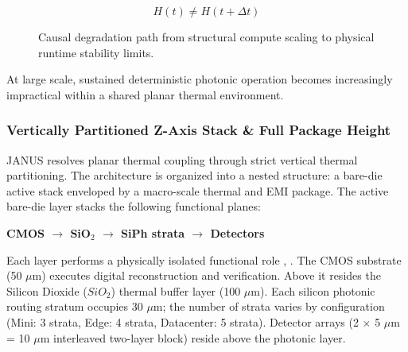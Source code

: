 \documentclass[journal]{IEEEtran}
\begin{document}
\begin{equation}
H(t) \neq  H(t + \Delta t)
\end{equation}

\begin{figure}[htbp]
\centering
{}
\caption{Causal degradation path from structural compute scaling to physical runtime stability limits.}
\label{fig:causal_degradation}
\end{figure}

At large scale, sustained deterministic photonic operation becomes increasingly impractical within a shared planar thermal environment.

\subsubsection{\textbf{Vertically Partitioned Z-Axis Stack \& Full Package Height}}

JANUS resolves planar thermal coupling through strict vertical thermal partitioning. The architecture is organized into a nested structure: a bare-die active stack enveloped by a macro-scale thermal and EMI package. The active bare-die layer stacks the following functional
planes:

\begin{center}
\textbf{CMOS $\rightarrow$ SiO$_2$ $\rightarrow$ SiPh strata $\rightarrow$ Detectors}
\end{center}

Each layer performs a physically isolated functional role \cite{Atabaki2018}, \cite{Fenouillet2009}. The CMOS substrate (50 $\mu$m) executes digital reconstruction and verification. Above it resides the Silicon Dioxide ($SiO_2$) thermal buffer layer (100 $\mu$m). Each silicon photonic routing stratum occupies 30 $\mu$m; the number of strata varies by configuration (Mini: 3 strata, Edge: 4 strata, Datacenter: 5 strata). Detector arrays (2 $\times$ 5 $\mu$m = 10 $\mu$m interleaved two-layer block) reside above the photonic layer.
\end{document}
